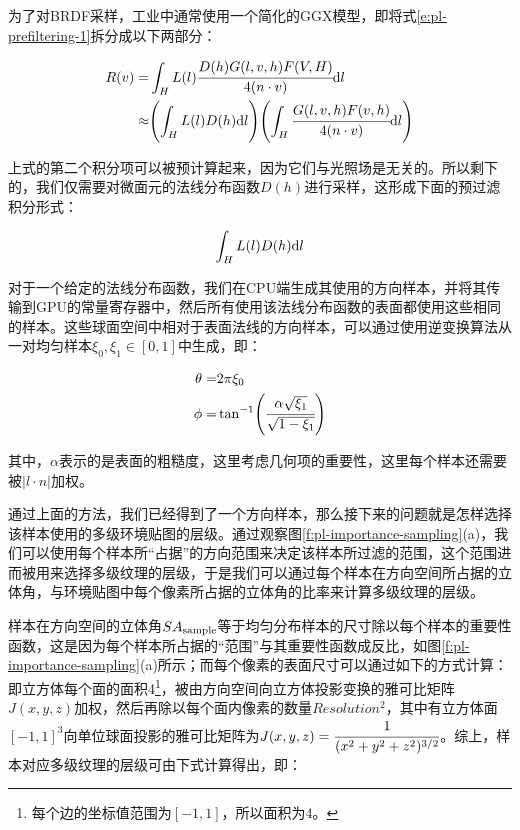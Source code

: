 为了对BRDF采样，工业中通常使用一个简化的GGX模型\cite{a:Physically-basedlightingincallofduty:Black,a:Gettingmorephysicalincallofduty:Blackopsii,a:RealShadinginUnrealEngine4}，即将式\ref{e:pl-prefiltering-1}拆分成以下两部分：

\begin{equation}
\begin{aligned}
	R(v)=&\int_H L(l)\cfrac{D(h)G(l,v,h)F(V,H)}{4(n\cdot v)}{\rm d}l\\
	\approx&\Biggl(\int_H L(l)D(h){\rm d}l\Biggl)\Biggl(\int_H \cfrac{G(l,v,h)F(v,h)}{4(n\cdot v)}{\rm d}l\Biggl)
\end{aligned}
\end{equation}

上式的第二个积分项可以被预计算起来，因为它们与光照场是无关的。所以剩下的，我们仅需要对微面元的法线分布函数$D(h)$进行采样，这形成下面的预过滤积分形式：

\begin{equation}\label{e:pl-intergal-directional}
	\int_H L(l)D(h){\rm d}l
\end{equation}

对于一个给定的法线分布函数，我们在CPU端生成其使用的方向样本，并将其传输到GPU的常量寄存器中，然后所有使用该法线分布函数的表面都使用这些相同的样本。这些球面空间中相对于表面法线的方向样本，可以通过使用逆变换算法从一对均匀样本$\xi_0,\xi_1\in[0,1]$中生成，即：

\begin{equation}\label{e:pl-uniform-sampling}
\begin{aligned}
	\theta=&2\pi \xi_0\\
	\phi=&\tan^{-1}\Biggl(\cfrac{\alpha\sqrt{\xi_1}}{\sqrt{1-\xi_1}}\Biggl)
\end{aligned}
\end{equation}

\noindent 其中，$\alpha$表示的是表面的粗糙度，这里考虑几何项的重要性，这里每个样本还需要被$|l\cdot n|$加权。

通过上面的方法，我们已经得到了一个方向样本，那么接下来的问题就是怎样选择该样本使用的多级环境贴图的层级。通过观察图\ref{f:pl-importance-sampling}(a)，我们可以使用每个样本所“占据”的方向范围来决定该样本所过滤的范围，这个范围进而被用来选择多级纹理的层级，于是我们可以通过每个样本在方向空间所占据的立体角，与环境贴图中每个像素所占据的立体角的比率来计算多级纹理的层级。

样本在方向空间的立体角$SA_{\rm sample}$等于均匀分布样本的尺寸除以每个样本的重要性函数，这是因为每个样本所占据的“范围”与其重要性函数成反比，如图\ref{f:pl-importance-sampling}(a)所示；而每个像素的表面尺寸可以通过如下的方式计算：即立方体每个面的面积4\footnote{每个边的坐标值范围为$[-1,1]$，所以面积为4。}，被由方向空间向立方体投影变换的雅可比矩阵$J(x,y,z)$加权，然后再除以每个面内像素的数量$Resolution^{2}$，其中有立方体面$[-1,1]^{3}$向单位球面投影的雅可比矩阵为$J(x,y,z)=\cfrac{1}{(x^{2}+y^{2}+z^{2})^{3/2}}$。综上，样本对应多级纹理的层级可由下式计算得出，即：

